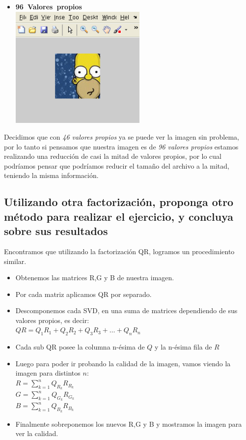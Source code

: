 \begin{itemize}
		\item \textbf{96\ Valores\ propios}\\
			\includegraphics[height=6cm]{img/homero_96} 	
	\end{itemize}

Decidimos que con \emph{46 valores propios} ya se puede ver la imagen sin problema,
por lo tanto si pensamos que nuestra imagen es de \emph{96 valores propios} estamos realizando una reducción
de casi la mitad de valores propios, por lo cual podríamos pensar que podríamos reducir el tamaño del archivo
a la mitad, teniendo la misma información.
\newpage

\subsection{Utilizando otra factorizaci\'on, proponga otro m\'etodo para realizar el ejercicio, y concluya sobre sus resultados}

Encontramos que utilizando la factorización QR, logramos un procedimiento similar.

\begin{itemize}
	\item Obtenemos las matrices R,G y B de nuestra imagen.
	\item Por cada matriz aplicamos QR por separado.
	\item Descomponemos cada SVD, en una suma de matrices dependiendo de sus valores propios, es decir:\\
	$Q R = Q_1 R_1 + Q_2 R_2 + Q_3 R_3 + \ldots + Q_n R_n$
	\item Cada sub QR posee la columna n-ésima de $Q$ y la n-ésima fila de $R$
	\item Luego para poder ir probando la calidad de la imagen,
		vamos viendo la imagen para distintos $n$:\\
		$R = \sum_{k=1}^{n}Q_{R_{k}}R_{R_{k}}$\\
		$G = \sum_{k=1}^{n}Q_{G_{k}}R_{G_{k}}$\\
		$B = \sum_{k=1}^{n}Q_{B_{k}}R_{B_{k}}$
	\item Finalmente sobreponemos los nuevos R,G y B y mostramos la imagen para ver la calidad.
\end{itemize}


